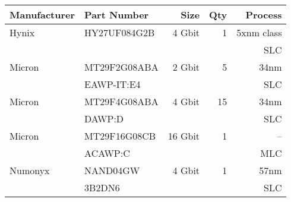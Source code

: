\begin{tabular}{|l|l|r|r|r|}
\hline

{\bf Manufacturer}& {\bf Part Number} & {\bf Size} & {\bf Qty} & {\bf Process} \\

\hline
Hynix & HY27UF084G2B & 4 Gbit & 1 & 5xnm class\\
       & & & & SLC\\
\hline
Micron & MT29F2G08ABA & 2 Gbit & 5 & 34nm \\
       & EAWP-IT:E4 & & & SLC\\
\hline
Micron & MT29F4G08ABA & 4 Gbit & 15 & 34nm \\
       & DAWP:D & & & SLC\\
\hline
Micron & MT29F16G08CB & 16 Gbit & 1 & -- \\
       & ACAWP:C & & & MLC\\
\hline
Numonyx & NAND04GW & 4 Gbit & 1 & 57nm \\
& 3B2DN6 & & & SLC\\
 
\hline

\end{tabular}

